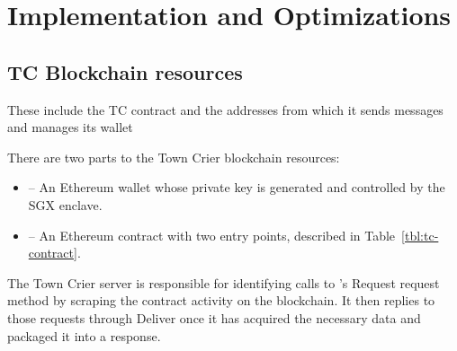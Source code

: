 \section{Implementation and Optimizations}

\subsection{TC Blockchain resources}
These include the TC contract and the addresses from which it sends messages and manages its wallet

There are two parts to the Town Crier blockchain resources:
\begin{itemize}
  \item \sgxadd -- An Ethereum wallet whose private key is generated and controlled by the SGX enclave.
  
  \item \tcont -- An Ethereum contract with two entry points, described in Table~\ref{tbl:tc-contract}.
\end{itemize}
The Town Crier server is responsible for identifying calls to \tcont's Request request method by scraping the contract activity on the blockchain.
It then replies to those requests through Deliver once it has acquired the necessary data and packaged it into a response.

